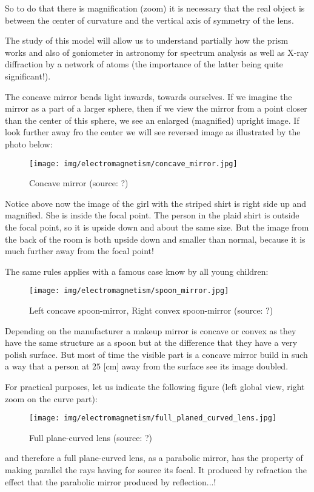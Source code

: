 	So to do that there is magnification (zoom) it is necessary that the real object is between the center of curvature and the vertical axis of symmetry of the lens.
	\begin{tcolorbox}[title=Remark,colframe=black,arc=10pt]
	The study of this model will allow us to understand partially how the prism works and also of goniometer in astronomy for spectrum analysis as well as X-ray diffraction by a network of atoms (the importance of the latter being quite significant!).
	\end{tcolorbox}
	The concave mirror bends light inwards, towards ourselves. If we imagine the mirror as a part of a larger sphere, then if we view the mirror from a point closer than the center of this sphere, we see an enlarged (magnified) upright image. If look further away fro the center we will see reversed image as illustrated by the photo below:
	\begin{figure}[H]
		\centering
		\texttt{[image: img/electromagnetism/concave\_mirror.jpg]}
		\caption[Concave mirror]{Concave mirror (source: ?)}
	\end{figure}
	Notice above now the image of the girl with the striped shirt is right side up and magnified. She is inside the focal point. The person in the plaid shirt is outside the focal point, so it is upside down and about the same size. But the image from the back of the room is both upside down and smaller than normal, because it is much further away from the focal point!
	
	The same rules applies with a famous case know by all young children:
	\begin{figure}[H]
		\centering
		\texttt{[image: img/electromagnetism/spoon\_mirror.jpg]}
		\caption[Left concave spoon-mirror, Right convex spoon-mirror]{Left concave spoon-mirror, Right convex spoon-mirror (source: ?)}
	\end{figure}
	\begin{tcolorbox}[title=Remark,colframe=black,arc=10pt]
	Depending on the manufacturer a makeup mirror is concave or convex as they have the same structure as a spoon but at the difference that they have a very polish surface. But most of time the visible part is a concave mirror build in such a way that a person at $25$ [cm] away from the surface see its image doubled.
	\end{tcolorbox}
	For practical purposes, let us indicate the following figure (left global view, right zoom on the curve part):
	\begin{figure}[H]
		\centering
		\texttt{[image: img/electromagnetism/full\_planed\_curved\_lens.jpg]}
		\caption[Full plane-curved lens]{Full plane-curved lens (source: ?)}
	\end{figure}
	and therefore a full plane-curved lens, as a parabolic mirror, has the property of making parallel the rays having for source its focal. It produced by refraction the effect that the parabolic mirror produced by reflection...!

